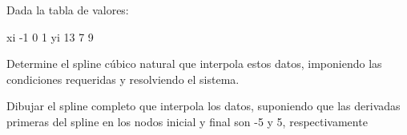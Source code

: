 Dada la tabla de valores:

xi -1 0 1
yi 13 7 9

Determine el spline cúbico natural que interpola estos datos, imponiendo las condiciones requeridas y resolviendo el sistema.

Dibujar el spline completo que interpola los datos, suponiendo que las derivadas primeras del spline en los nodos inicial y final son -5 y 5, respectivamente

